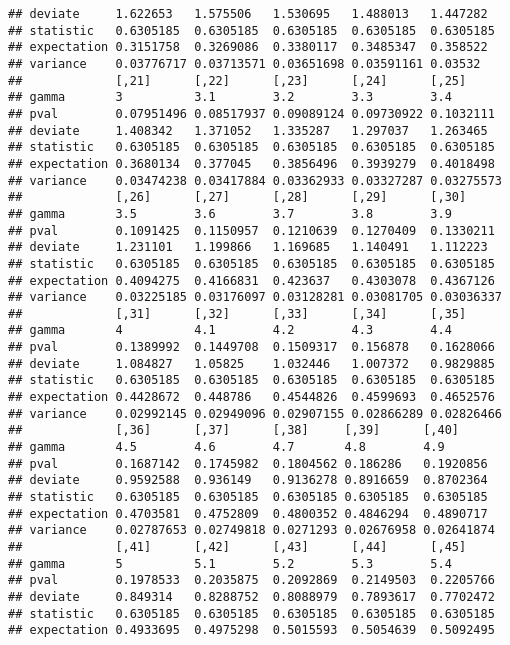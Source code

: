 \documentclass[11pt,leqno]{article}\usepackage[]{graphicx}\usepackage[]{color}
\makeatletter
\newenvironment{kframe}{%
 \def\at@end@of@kframe{}%
 \ifinner\ifhmode%
  \def\at@end@of@kframe{\end{minipage}}%
  \begin{minipage}{\columnwidth}%
 \fi\fi%
 \def\FrameCommand##1{\hskip\@totalleftmargin \hskip-\fboxsep
 \colorbox{shadecolor}{##1}\hskip-\fboxsep
     \hskip-\linewidth \hskip-\@totalleftmargin \hskip\columnwidth}%
 \MakeFramed {\advance\hsize-\width
   \@totalleftmargin\z@ \linewidth\hsize
   \@setminipage}}%
 {\par\unskip\endMakeFramed%
 \at@end@of@kframe}
\newenvironment{knitrout}{}{} %
\theoremstyle{newstyle}
\makeatother
\begin{document}
\begin{knitrout}
\begin{kframe}
\begin{verbatim}
## deviate     1.622653   1.575506   1.530695   1.488013   1.447282  
## statistic   0.6305185  0.6305185  0.6305185  0.6305185  0.6305185 
## expectation 0.3151758  0.3269086  0.3380117  0.3485347  0.358522  
## variance    0.03776717 0.03713571 0.03651698 0.03591161 0.03532   
##             [,21]      [,22]      [,23]      [,24]      [,25]     
## gamma       3          3.1        3.2        3.3        3.4       
## pval        0.07951496 0.08517937 0.09089124 0.09730922 0.1032111 
## deviate     1.408342   1.371052   1.335287   1.297037   1.263465  
## statistic   0.6305185  0.6305185  0.6305185  0.6305185  0.6305185 
## expectation 0.3680134  0.377045   0.3856496  0.3939279  0.4018498 
## variance    0.03474238 0.03417884 0.03362933 0.03327287 0.03275573
##             [,26]      [,27]      [,28]      [,29]      [,30]     
## gamma       3.5        3.6        3.7        3.8        3.9       
## pval        0.1091425  0.1150957  0.1210639  0.1270409  0.1330211 
## deviate     1.231101   1.199866   1.169685   1.140491   1.112223  
## statistic   0.6305185  0.6305185  0.6305185  0.6305185  0.6305185 
## expectation 0.4094275  0.4166831  0.423637   0.4303078  0.4367126 
## variance    0.03225185 0.03176097 0.03128281 0.03081705 0.03036337
##             [,31]      [,32]      [,33]      [,34]      [,35]     
## gamma       4          4.1        4.2        4.3        4.4       
## pval        0.1389992  0.1449708  0.1509317  0.156878   0.1628066 
## deviate     1.084827   1.05825    1.032446   1.007372   0.9829885 
## statistic   0.6305185  0.6305185  0.6305185  0.6305185  0.6305185 
## expectation 0.4428672  0.448786   0.4544826  0.4599693  0.4652576 
## variance    0.02992145 0.02949096 0.02907155 0.02866289 0.02826466
##             [,36]      [,37]      [,38]     [,39]      [,40]     
## gamma       4.5        4.6        4.7       4.8        4.9       
## pval        0.1687142  0.1745982  0.1804562 0.186286   0.1920856 
## deviate     0.9592588  0.936149   0.9136278 0.8916659  0.8702364 
## statistic   0.6305185  0.6305185  0.6305185 0.6305185  0.6305185 
## expectation 0.4703581  0.4752809  0.4800352 0.4846294  0.4890717 
## variance    0.02787653 0.02749818 0.0271293 0.02676958 0.02641874
##             [,41]      [,42]      [,43]      [,44]      [,45]     
## gamma       5          5.1        5.2        5.3        5.4       
## pval        0.1978533  0.2035875  0.2092869  0.2149503  0.2205766 
## deviate     0.849314   0.8288752  0.8088979  0.7893617  0.7702472 
## statistic   0.6305185  0.6305185  0.6305185  0.6305185  0.6305185 
## expectation 0.4933695  0.4975298  0.5015593  0.5054639  0.5092495 

\end{verbatim}
\end{kframe}
\end{knitrout}
\end{document}
